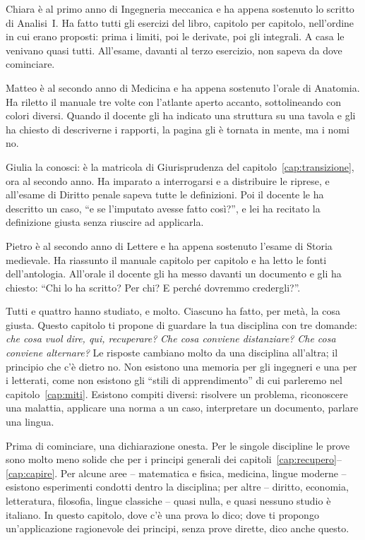 Chiara è al primo anno di Ingegneria meccanica e ha appena sostenuto lo
scritto di Analisi~I. Ha fatto tutti gli esercizi del libro, capitolo
per capitolo, nell'ordine in cui erano proposti: prima i limiti, poi le
derivate, poi gli integrali. A casa le venivano quasi tutti. All'esame,
davanti al terzo esercizio, non sapeva da dove cominciare.

Matteo è al secondo anno di Medicina e ha appena sostenuto l'orale di
Anatomia. Ha riletto il manuale tre volte con l'atlante aperto accanto,
sottolineando con colori diversi. Quando il docente gli ha indicato una
struttura su una tavola e gli ha chiesto di descriverne i rapporti, la
pagina gli è tornata in mente, ma i nomi no.

Giulia la conosci: è la matricola di Giurisprudenza del
capitolo~\ref{cap:transizione}, ora al secondo anno. Ha imparato a
interrogarsi e a distribuire le riprese, e all'esame di Diritto penale
sapeva tutte le definizioni. Poi il docente le ha descritto un caso,
\enquote{e se l'imputato avesse fatto così?}, e lei ha recitato la
definizione giusta senza riuscire ad applicarla.

Pietro è al secondo anno di Lettere e ha appena sostenuto l'esame di
Storia medievale. Ha riassunto il manuale capitolo per capitolo e ha
letto le fonti dell'antologia. All'orale il docente gli ha messo davanti
un documento e gli ha chiesto: \enquote{Chi lo ha scritto? Per chi? E
perché dovremmo credergli?}.

Tutti e quattro hanno studiato, e molto. Ciascuno ha fatto, per metà,
la cosa giusta. Questo capitolo ti propone di guardare la tua
disciplina con tre domande: \emph{che cosa vuol dire, qui,
recuperare?} \emph{Che cosa conviene distanziare?} \emph{Che cosa
conviene alternare?} Le risposte cambiano molto da una disciplina
all'altra; il principio che c'è dietro no. Non esistono una memoria
per gli ingegneri e una per i letterati, come non esistono gli
\enquote{stili di apprendimento} di cui parleremo nel
capitolo~\ref{cap:miti}. Esistono compiti diversi: risolvere un
problema, riconoscere una malattia, applicare una norma a un caso,
interpretare un documento, parlare una lingua.

Prima di cominciare, una dichiarazione onesta. Per le singole
discipline le prove sono molto meno solide che per i principi generali
dei capitoli~\ref{cap:recupero}--\ref{cap:capire}. Per alcune aree --
matematica e fisica, medicina, lingue moderne -- esistono esperimenti
condotti dentro la disciplina; per altre -- diritto, economia,
letteratura, filosofia, lingue classiche -- quasi nulla, e quasi
nessuno studio è italiano. In questo capitolo, dove c'è una prova lo
dico; dove ti propongo un'applicazione ragionevole dei principi, senza
prove dirette, dico anche questo.

